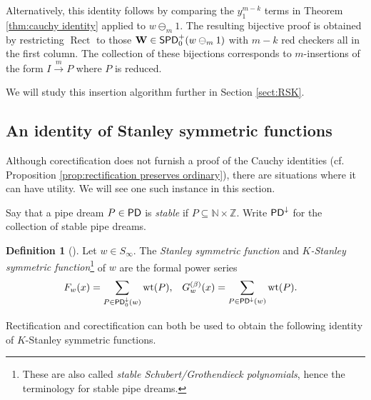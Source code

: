 \documentclass[11pt,reqno]{amsart} %
\newcommand{\bbN}{\mathbb{N}}
\newcommand{\bbZ}{\mathbb{Z}}
\newcommand{\bfW}{\mathbf{W}}
\newcommand{\sseq}{\subseteq}
\newcommand{\msert}{\overset{m}{\rightarrow}}
\DeclareMathOperator{\wt}{wt}
\DeclareMathOperator{\PD}{\sf{PD}}
\DeclareMathOperator{\SPD}{\sf{SPD}}
\DeclareMathOperator{\Rect}{Rect} %
\theoremstyle{definition}
\newtheorem{definition}[theorem]{Definition}
\begin{document}
\noindent
Alternatively, this identity follows by comparing the $y_1^{m-k}$ terms in Theorem \ref{thm:cauchy identity} applied to $w\ominus_m 1$.
The resulting bijective proof is obtained by restricting $\Rect$ to those $\bfW\in \SPD_0^+(w\ominus_m 1)$ with $m-k$ red checkers all in the first column.
The collection of these bijections corresponds to $m$-insertions of the form $I\msert P$ where $P$ is reduced.

We will study this insertion algorithm further in Section \ref{sect:RSK}.



\subsection{An identity of Stanley symmetric functions}
\label{subsect:Stanley symmetric}

Although corectification does not furnish a proof of the Cauchy identities (cf. Proposition \ref{prop:rectification preserves ordinary}), there are situations where it can have utility.
We will see one such instance in this section.

Say that a pipe dream $P\in \PD$ is \textit{stable} if $P\sseq \bbN\times \bbZ$.
Write $\PD^{\downarrow}$ for the collection of stable pipe dreams.

\begin{definition}[\cite{Stanley84}]
\label{def:stanley symmetric}
Let $w\in S_\infty$.
The \textit{Stanley symmetric function} and \textit{$K$-Stanley symmetric function}\footnote{
    These are also called \textit{stable Schubert/Grothendieck polynomials}, hence the terminology for stable pipe dreams.
} of $w$ are the formal power series \begin{align*}
    F_w(x) &= \sum_{P\in \PD^\downarrow_0(w)} \wt(P), &
    G_w^{(\beta)}(x) &= \sum_{P\in \PD^\downarrow(w)} \wt(P).
\end{align*}
\end{definition}

Rectification and corectification can both be used to obtain the following identity of $K$-Stanley symmetric functions.
\end{document}
